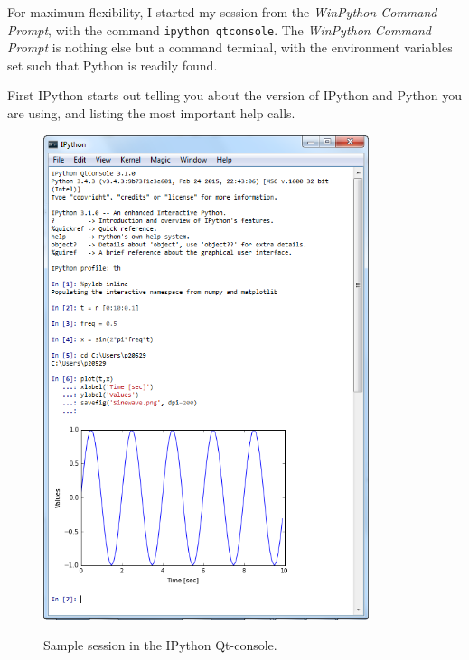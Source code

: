 For maximum flexibility, I started my session from the \emph{WinPython Command Prompt}, with the command \lstinline{ipython qtconsole}. The \emph{WinPython Command Prompt} is nothing else but a command terminal, with the environment variables set such that Python is readily found.

First IPython starts out telling you about the version of IPython and Python you are using, and listing the most important help calls.

\begin{figure}
  \centering
  \includegraphics[width=0.85\textwidth]{../Images/qtConsole.png}\\
  \caption{Sample session in the IPython Qt-console.}
  \label{fig:qtConsole}
\end{figure}


